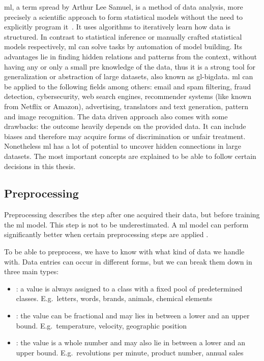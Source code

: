 \gls{ml}, a term spread by Arthur Lee Samuel, is a method of data analysis, more precisely a scientific approach to form statistical models without the need to explicitly program it~\cite{mahesh2020machine}.
It uses algorithms to iteratively learn how data is structured.
In contrast to statistical inference or manually crafted statistical models respectively, \gls{ml} can solve tasks by automation of model building.
Its advantages lie in finding hidden relations and patterns from the context, without having any or only a small pre knowledge of the data, thus it is a strong tool for generalization or abstraction of large datasets, also known as \gls{gl-bigdata}.
\gls{ml} can be applied to the following fields among others: email and spam filtering, fraud detection, cybersecurity, web search engines, recommender systems (like known from Netflix or Amazon), advertising, translators and text generation, pattern and image recognition.
The data driven approach also comes with some drawbacks: the outcome heavily depends on the provided data.
It can include biases and therefore may acquire forms of discrimination or unfair treatment.
Nonetheless \gls{ml} has a lot of potential to uncover hidden connections in large datasets.
The most important concepts are explained to be able to follow certain decisions in this thesis.


\subsection{Preprocessing}
\label{subsec:preprocessing}

Preprocessing describes the step after one acquired their data, but before training the \gls{ml} model.
This step is not to be underestimated.
A \gls{ml} model can perform significantly better when certain preprocessing steps are applied \cite{alam2019impact}.

To be able to preprocess, we have to know with what kind of data we handle with.
Data entries can occur in different forms, but we can break them down in three main types:
\begin{itemize}
    \item {}: a value is always assigned to a class with a fixed pool of predetermined classes.
          E.g.\ letters, words, brands, animals, chemical elements
    \item {}: the value can be fractional and may lies in between a lower and an upper bound.
          E.g.\ temperature, velocity, geographic position
    \item {}: the value is a whole number and may also lie in between a lower and an upper bound.
          E.g.\ revolutions per minute, product number, annual sales
\end{itemize}

